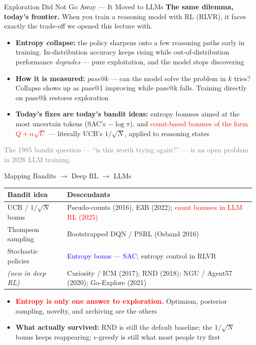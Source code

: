 \begin{frame}{Exploration Did Not Go Away --- It Moved to LLMs}
\textbf{The same dilemma, today's frontier.} When you train a reasoning model with RL (RLVR), it faces exactly the trade-off we opened this lecture with.
\vspace{0.4em}
\begin{itemize}
    \setlength{\itemsep}{0.5em}
    \item \textbf{Entropy collapse:} the policy sharpens onto a few reasoning paths early in training. In-distribution accuracy keeps rising while out-of-distribution performance \emph{degrades} --- pure exploitation, and the model stops discovering
    \item \textbf{How it is measured:} \emph{pass@k} --- can the model solve the problem in $k$ tries? Collapse shows up as pass@1 improving while pass@k falls. Training directly on pass@k restores exploration
    \item \textbf{Today's fixes are today's bandit ideas:} entropy bonuses aimed at the most uncertain tokens (SAC's $-\log\pi$), and \textcolor{red}{count-based bonuses of the form $Q + \alpha\sqrt{U}$} --- literally UCB's $1/\sqrt{N}$, applied to reasoning states
\end{itemize}
\vspace{0.3em}
\centering\small\textcolor{gray}{The 1985 bandit question --- ``is this worth trying again?'' --- is an open problem in 2026 LLM training.}
\end{frame}

\begin{frame}{Mapping Bandits $\longrightarrow$ Deep RL $\longrightarrow$ LLMs}
\begin{center}
\renewcommand{\arraystretch}{1.4}
\footnotesize
\begin{tabular}{p{}p{}}
\hline
\textbf{Bandit idea} & \textbf{Descendants} \\
\hline
UCB / $1/\sqrt{N}$ bonus & Pseudo-counts (2016), E3B (2022); \textcolor{red}{count bonuses in LLM RL (2025)} \\
Thompson sampling     & Bootstrapped DQN / PSRL (Osband 2016) \\
Stochastic policies   & \textcolor{blue}{Entropy bonus --- SAC}; entropy control in RLVR \\
\emph{(new in deep RL)} & Curiosity / ICM (2017); RND (2018); NGU / Agent57 (2020); Go-Explore (2021) \\
\hline
\end{tabular}
\end{center}
\vspace{0.5em}
\begin{itemize}
    \setlength{\itemsep}{0.45em}
    \item \textcolor{red}{\textbf{Entropy is only one answer to exploration.}} Optimism, posterior sampling, novelty, and archiving are the others
    \item \textbf{What actually survived:} RND is still the default baseline; the $1/\sqrt{N}$ bonus keeps reappearing; $\epsilon$-greedy is still what most people try first
\end{itemize}
\end{frame}

